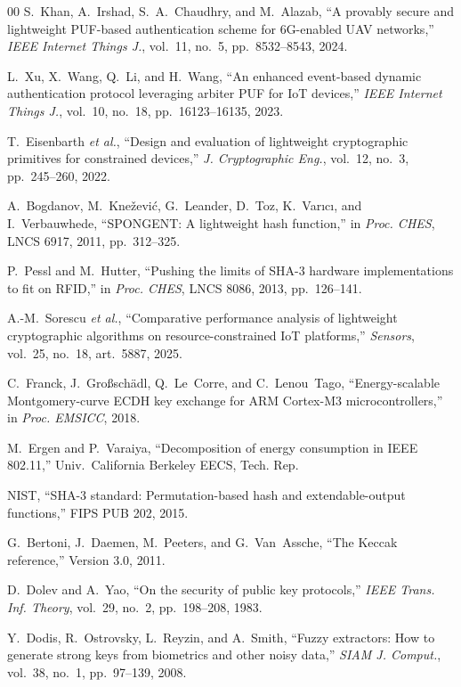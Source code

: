 \documentclass[journal]{IEEEtran}
\begin{document}
\begin{thebibliography}{00}
S.~Khan, A.~Irshad, S.~A.~Chaudhry, and M.~Alazab, ``A provably secure and lightweight PUF-based authentication scheme for 6G-enabled UAV networks,'' \emph{IEEE Internet Things J.}, vol.~11, no.~5, pp.~8532--8543, 2024.

L.~Xu, X.~Wang, Q.~Li, and H.~Wang, ``An enhanced event-based dynamic authentication protocol leveraging arbiter PUF for IoT devices,'' \emph{IEEE Internet Things J.}, vol.~10, no.~18, pp.~16123--16135, 2023.

T.~Eisenbarth \emph{et al.}, ``Design and evaluation of lightweight cryptographic primitives for constrained devices,'' \emph{J. Cryptographic Eng.}, vol.~12, no.~3, pp.~245--260, 2022.

A.~Bogdanov, M.~Kne\v{z}evi\'c, G.~Leander, D.~Toz, K.~Var{\i}c{\i}, and I.~Verbauwhede, ``SPONGENT: A lightweight hash function,'' in \emph{Proc. CHES}, LNCS 6917, 2011, pp.~312--325.

P.~Pessl and M.~Hutter, ``Pushing the limits of SHA-3 hardware implementations to fit on RFID,'' in \emph{Proc. CHES}, LNCS 8086, 2013, pp.~126--141.

A.-M.~Sorescu \emph{et al.}, ``Comparative performance analysis of lightweight cryptographic algorithms on resource-constrained IoT platforms,'' \emph{Sensors}, vol.~25, no.~18, art.~5887, 2025.

C.~Franck, J.~Gro{\ss}sch\"adl, Q.~Le~Corre, and C.~Lenou~Tago, ``Energy-scalable Montgomery-curve ECDH key exchange for ARM Cortex-M3 microcontrollers,'' in \emph{Proc. EMSICC}, 2018.

M.~Ergen and P.~Varaiya, ``Decomposition of energy consumption in IEEE 802.11,'' Univ.\ California Berkeley EECS, Tech. Rep.

NIST, ``SHA-3 standard: Permutation-based hash and extendable-output functions,'' FIPS PUB 202, 2015.

G.~Bertoni, J.~Daemen, M.~Peeters, and G.~Van~Assche, ``The Keccak reference,'' Version 3.0, 2011.

D.~Dolev and A.~Yao, ``On the security of public key protocols,'' \emph{IEEE Trans. Inf. Theory}, vol.~29, no.~2, pp.~198--208, 1983.

Y.~Dodis, R.~Ostrovsky, L.~Reyzin, and A.~Smith, ``Fuzzy extractors: How to generate strong keys from biometrics and other noisy data,'' \emph{SIAM J. Comput.}, vol.~38, no.~1, pp.~97--139, 2008.


\end{thebibliography}
\end{document}

